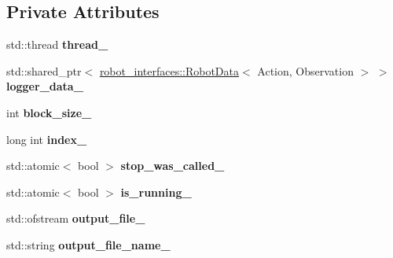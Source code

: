 \subsection*{Private Attributes}
\begin{DoxyCompactItemize}
\item 
\mbox{\label{classrobot__interfaces_1_1RobotLogger_a913d7af3357263aeb4b4296af92d417b}} 
std\+::thread {\bfseries thread\+\_\+}
\item 
\mbox{\label{classrobot__interfaces_1_1RobotLogger_ad1391bc38ff516f01b3c8bdd91e27efc}} 
std\+::shared\+\_\+ptr$<$ \hyperlink{classrobot__interfaces_1_1RobotData}{robot\+\_\+interfaces\+::\+Robot\+Data}$<$ Action, Observation $>$ $>$ {\bfseries logger\+\_\+data\+\_\+}
\item 
\mbox{\label{classrobot__interfaces_1_1RobotLogger_a0465f86efac78a429f8980bd2a12959e}} 
int {\bfseries block\+\_\+size\+\_\+}
\item 
\mbox{\label{classrobot__interfaces_1_1RobotLogger_ac47398855bcb94ca8a3e83334ee1d382}} 
long int {\bfseries index\+\_\+}
\item 
\mbox{\label{classrobot__interfaces_1_1RobotLogger_afeed0904c937b1fd7f88512456e98b80}} 
std\+::atomic$<$ bool $>$ {\bfseries stop\+\_\+was\+\_\+called\+\_\+}
\item 
\mbox{\label{classrobot__interfaces_1_1RobotLogger_a7b3d0546de38f9ce6ba8ef8302126f59}} 
std\+::atomic$<$ bool $>$ {\bfseries is\+\_\+running\+\_\+}
\item 
\mbox{\label{classrobot__interfaces_1_1RobotLogger_aa03a18fb24545744533c39e193c5920a}} 
std\+::ofstream {\bfseries output\+\_\+file\+\_\+}
\item 
\mbox{\label{classrobot__interfaces_1_1RobotLogger_a180a1ad565fd1a2342c6a40465fea731}} 
std\+::string {\bfseries output\+\_\+file\+\_\+name\+\_\+}
\end{DoxyCompactItemize}


